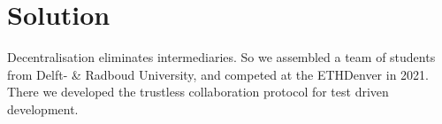 \vspace{-0.16cm}
\section{Solution}
\vspace{-0.15cm}
Decentralisation eliminates intermediaries. So we assembled a team of students from Delft- \& Radboud University, and competed at the ETHDenver in 2021. There we developed the trustless collaboration protocol for test driven development. %
